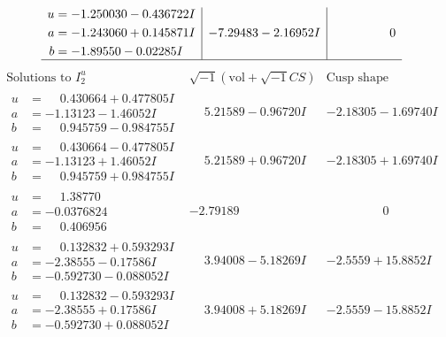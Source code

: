 \documentclass[1p]{elsarticle_modified}
\theoremstyle{definition}
\newcommand{\I}{\sqrt{-1}}
\begin{document}
$$\begin{array}{c|c|c}
\begin{aligned}
u &= -1.250030 - 0.436722 I \\
a &= -1.243060 + 0.145871 I \\
b &= -1.89550 - 0.02285 I\end{aligned}
 & -7.29483 - 2.16952 I & \phantom{-0.000000 } 0\\
 \hline 
 \end{array}$$\newpage$$\begin{array}{c|c|c}  
\text{Solutions to }I^u_{2}& \I (\text{vol} + \sqrt{-1}CS) & \text{Cusp shape}\\
 \hline 
\begin{aligned}
u &= \phantom{-}0.430664 + 0.477805 I \\
a &= -1.13123 - 1.46052 I \\
b &= \phantom{-}0.945759 - 0.984755 I\end{aligned}
 & \phantom{-}5.21589 - 0.96720 I & -2.18305 - 1.69740 I \\ \hline\begin{aligned}
u &= \phantom{-}0.430664 - 0.477805 I \\
a &= -1.13123 + 1.46052 I \\
b &= \phantom{-}0.945759 + 0.984755 I\end{aligned}
 & \phantom{-}5.21589 + 0.96720 I & -2.18305 + 1.69740 I \\ \hline\begin{aligned}
u &= \phantom{-}1.38770\phantom{ +0.000000I} \\
a &= -0.0376824\phantom{ +0.000000I} \\
b &= \phantom{-}0.406956\phantom{ +0.000000I}\end{aligned}
 & -2.79189\phantom{ +0.000000I} & \phantom{-0.000000 } 0 \\ \hline\begin{aligned}
u &= \phantom{-}0.132832 + 0.593293 I \\
a &= -2.38555 - 0.17586 I \\
b &= -0.592730 - 0.088052 I\end{aligned}
 & \phantom{-}3.94008 - 5.18269 I & -2.5559 + 15.8852 I \\ \hline\begin{aligned}
u &= \phantom{-}0.132832 - 0.593293 I \\
a &= -2.38555 + 0.17586 I \\
b &= -0.592730 + 0.088052 I\end{aligned}
 & \phantom{-}3.94008 + 5.18269 I & -2.5559 - 15.8852 I \\ \hline\begin{aligned}

\end{aligned}
\end{array}$$
\end{document}
